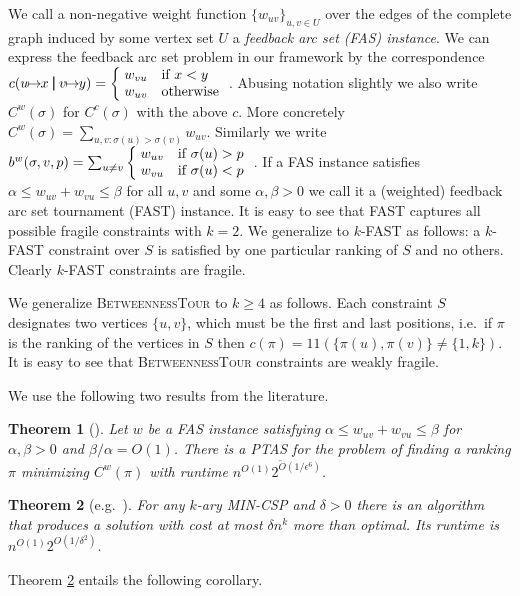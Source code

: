 \documentclass[dvips,11pt,letter]{article}
\makeatletter
\newcommand{\oneone}{1\!\!1}
\newcommand{\one}[1]{\oneone\left(#1\right)}
\newcommand{\piecewise}[1]{\left\{\begin{array}{@{\;}ll}#1\end{array}\right.}
\newcommand{\set}[1]{\{#1\}}                        \newcommand{\setof}[2]{\{\,{#1}\::\:{#2}\,\}}        \newcommand{\groupFrac}[2]{\left(\frac{#1}{#2}\right)}
\newtheorem{theorem}{Theorem} \newtheorem{conjecture}[theorem]{Conjecture}
\newcommand{\unaryOrdering}{\!\!\mapsto\!\!}
\newcommand{\betTour}{\textsc{BetweennessTour}}
\newcommand{\fast}{\textsc{FAST}}
\newcommand{\bp}{\,\,\rule[-0.22em]{0.08em}{1em}\,\,} \newcommand{\restrictO}[2]{{#1}_{#2}}
\makeatother
\begin{document}
We call a non-negative weight function $\set{w_{uv}}_{u,v \in U}$ over the edges of the complete graph induced by some vertex set $U$ a \emph{feedback arc set (FAS) instance}. We can express the feedback arc set problem in our framework by the correspondence $c(u \unaryOrdering x \bp v \unaryOrdering y)=\piecewise{w_{vu} & \text{if } x< y\\ w_{uv} & \text{otherwise}}$.
Abusing notation slightly we also write $C^w(\sigma)$ for $C^c(\sigma)$ with the above $c$.
More concretely $C^w(\sigma) = \sum_{u,v:\sigma(u)>\sigma(v)} w_{uv}$.
Similarly we write $b^{w}(\sigma, v, p) = \sum_{u \ne v} \piecewise{ w_{uv} & \text{if }\sigma(u) > p \\ w_{vu} & \text{if }\sigma(u) < p}$.
If a FAS instance satisfies $\alpha \le w_{uv}+w_{vu} \le \beta$ for all $u,v$ and some $\alpha,\beta>0$ we call it a (weighted) feedback arc set tournament (\fast{}) instance.
It is easy to see that \fast{} captures all possible fragile constraints with $k=2$.
We generalize to $k$-FAST as follows: a $k$-FAST constraint over $S$ is satisfied by one particular ranking of $S$ and no others. Clearly $k$-FAST constraints are fragile.

We generalize \betTour{} to $k \ge 4$ as follows. Each constraint $S$ designates two vertices $\set{u,v}$, which must be the first and last positions, i.e.\ if $\pi$ is the ranking of the vertices in $S$ then $c(\pi) = \one{ \set{\pi(u),\pi(v)} \ne \set{1,k}}$. It is easy to see that \betTour{} constraints are weakly fragile.

We use the following two results from the literature.

\begin{theorem}[\cite{mathieu09fast}] \label{thm:fastPTAS}
Let $w$ be a FAS instance satisfying $\alpha \le w_{uv} + w_{vu} \le \beta$ for $\alpha,\beta>0$ and $\beta/\alpha=O(1)$. 
There is a PTAS for the problem of finding a ranking $\pi$ minimizing $C^w(\pi)$ with runtime $n^{O(1)} 2^{\tilde O(1/\epsilon^6)}$.
\end{theorem}

\begin{theorem}[e.g.\ \cite{AKK95,MS08}] \label{thm:addApproxCSP}
For any $k$-ary MIN-CSP and $\delta > 0$ there is an algorithm that produces a solution with cost at most $\delta n^k$ more than optimal. Its runtime is $n^{O(1)} 2^{O(1/\delta^2)}$.
\end{theorem}

Theorem \ref{thm:addApproxCSP} entails the following corollary.
\end{document}
